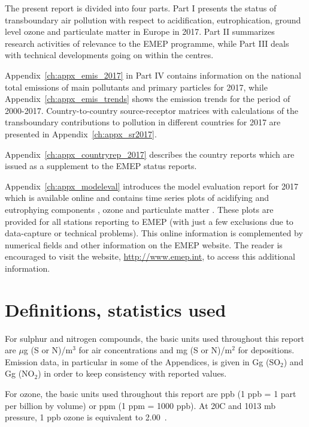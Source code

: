 The present report is divided into four parts. Part I presents the status
of transboundary air pollution with respect to acidification, eutrophication,
ground level ozone and particulate matter in Europe in 2017.
Part II summarizes research activities of relevance to the
EMEP programme, while Part III deals with technical developments going on within the centres.

Appendix~\ref{ch:appx_emis_2017} in Part IV contains information on the national total emissions of main pollutants and  primary particles for 2017, while Appendix~\ref{ch:appx_emis_trends} shows the  emission trends for the period of 2000-2017. Country-to-count\-ry source-receptor matrices with calculations of
the transboundary contributions to pollution in different countries
for 2017 are presented in Appendix~\ref{ch:appx_sr2017}.

Appendix~\ref{ch:appx_countryrep_2017} describes the country
reports which are  issued as a supplement to the EMEP status reports.

Appendix~\ref{ch:appx_modeleval} introduces the model evaluation
report for 2017 \citep{WEB2019:Eval} which is available online and contains time series plots
of acidifying and eutrophying components
\citep{WEB2019:SN}, ozone \citep{WEB2019:O3} and particulate matter \citep{WEB2019:PM}. These plots are provided for all stations reporting to
EMEP (with just a few exclusions due to data-capture or technical problems).
This online information is complemented by numerical fields and other
information on the EMEP website. The reader is encouraged to visit the
website, \url{http://www.emep.int}, to access this additional information.



\section{Definitions, statistics used}
\label{DEFS}

For sulphur and nitrogen compounds, the basic units used throughout
this report are $\mu$g (S or N)/m$^{3}$ for air concentrations and
mg (S or N)/m$^{2}$ for depositions. Emission data, in particular in
some of the Appendices, is given in Gg (SO$_2$)  and Gg (NO$_2$) in
order to keep consistency with reported values.

For ozone, the basic units used throughout this report are ppb (1 ppb
= 1 part per billion by volume) or ppm (1 ppm = 1000 ppb).  At
20\degrees C and 1013 mb pressure, 1 ppb ozone is equivalent to
2.00~\ug.  \vspace{0.5cm}

